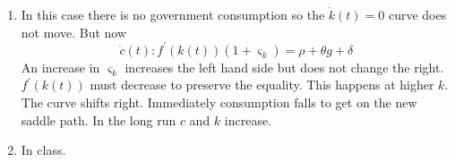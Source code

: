 \documentclass{article}
\begin{document}
\begin{enumerate}
\begin{enumerate}
\item In this case there is no government consumption so the $\dot{k}\left(
t\right) =0$ curve does not move. But now%
\begin{equation*}
\dot{c}\left( t\right) :f^{\prime }\left( k\left( t\right) \right) \left(
1+\varsigma _{k}\right) =\rho +\theta g+\delta 
\end{equation*}%
An increase in $\varsigma _{k}$ increases the left hand side but does not
change the right. $f^{\prime }\left( k\left( t\right) \right) $ must
decrease to preserve the equality. This happens at higher $k.$ The curve
shifts right. Immediately consumption falls to get on the new saddle path.
In the long run $c$ and $k$ increase.   

\item In class.  
\end{enumerate}
\end{enumerate}
\end{document}
